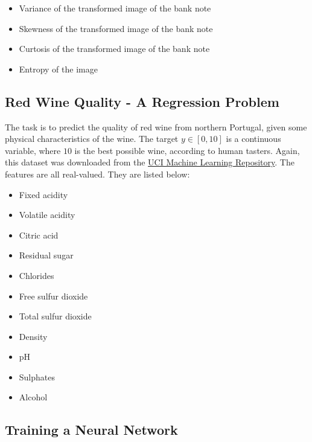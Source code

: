 \documentclass[12pt]{article}
\begin{document}
\begin{itemize}
    \setlength\itemsep{1px}
    \item Variance of the transformed image of the bank note
    \item Skewness of the transformed image of the bank note
    \item Curtosis of the transformed image of the bank note
    \item Entropy of the image
\end{itemize}

\subsection{Red Wine Quality - A Regression Problem}

The task is to predict the quality of red wine from northern Portugal, given some physical characteristics of the wine. The target $y \in [0, 10]$ is a continuous variable, where $10$ is the best possible wine, according to human tasters. Again, this dataset was downloaded from the \href{https://archive.ics.uci.edu/ml/datasets/banknote+authentication}{UCI Machine Learning Repository}. The features are all real-valued. They are listed below:

\begin{multicols}{3}
\begin{itemize}
    \setlength\itemsep{1px}
    \item Fixed acidity
    \item Volatile acidity
    \item Citric acid
    \item Residual sugar
    \item Chlorides
    \item Free sulfur dioxide
    \item Total sulfur dioxide
    \item Density
    \item pH
    \item Sulphates
    \item Alcohol
\end{itemize}
\end{multicols}

\subsection{Training a Neural Network}
\end{document}
